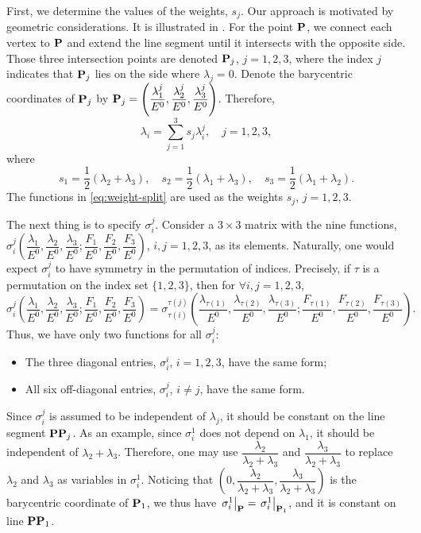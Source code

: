 First, we determine the values of the weights, $s_j$. Our approach is 
motivated by geometric considerations. It is illustrated in
. For the point $\mathbf{P}$, we connect each 
vertex to $\mathbf{P}$ and extend the line segment until it intersects with the
opposite side. Those three intersection points are denoted $\mathbf{P}_j$,
$j = 1,2,3$, where the index $j$ indicates that $\mathbf{P}_j$ lies on the side where
$\lambda_j = 0$. Denote the barycentric coordinates of $\mathbf{P}_j$ by 
$\mathbf{P}_j = \left( \dfrac{\lambda^j_1}{E^0}, \dfrac{\lambda^j_2}{E^0},
\dfrac{\lambda^j_3}{E^0} \right)$.
Therefore,
\[
  \lambda_i = \sum\limits_{j=1}^3 s_j \lambda^j_i,\quad
  j = 1,2,3,
\]
where
\begin{equation}\label{eq:weight-split} 
  s_1 = \frac12(\lambda_2+\lambda_3),\quad
  s_2 = \frac12(\lambda_1+\lambda_3),\quad
  s_3 = \frac12(\lambda_1+\lambda_2).
\end{equation}
The functions in \eqref{eq:weight-split} are used as the weights $s_j$, 
$j=1,2,3$.

The next thing is to specify $\sigma^j_i$.
Consider a $3 \times 3$ matrix with the nine functions,
$\sigma^j_i \left(\dfrac{\lambda_1}{E^0},
  \dfrac{\lambda_2}{E^0},\dfrac{\lambda_3}{E^0};
  \dfrac{F_1}{E^0},\dfrac{F_2}{E^0}, \dfrac{F_3}{E^0}\right)$,
$i, j = 1,2,3$, as its elements. Naturally, one would expect $\sigma^j_i$
to have symmetry in the permutation of indices. Precisely, if $\tau$ is a permutation on
the index set $\{1,2,3\}$, then for $\forall i, j = 1,2,3$,
\[
\sigma^j_i \left(\dfrac{\lambda_1}{E^0},
  \dfrac{\lambda_2}{E^0},\dfrac{\lambda_3}{E^0};
  \dfrac{F_1}{E^0},\dfrac{F_2}{E^0}, \dfrac{F_3}{E^0}\right) =
\sigma^{\tau(j)}_{\tau(i)} \left(\dfrac{\lambda_{\tau(1)}}{E^0},
  \dfrac{\lambda_{\tau(2)}}{E^0},\dfrac{\lambda_{\tau(3)}}{E^0};
  \dfrac{F_{\tau(1)}}{E^0},\dfrac{F_{\tau(2)}}{E^0},
  \dfrac{F_{\tau(3)}}{E^0}\right).
\]
Thus, we have only two functions for all $\sigma^j_i$:
\begin{itemize}
\item The three diagonal entries, $\sigma^i_i$, $i = 1,2,3$, have the
  same form;
\item All six off-diagonal entries, $\sigma^j_i$, $i \neq j$, have
  the same form.
\end{itemize}
Since $\sigma_i^j$ is assumed to be independent of $\lambda_j$, it
should be constant on the line segment ${\mathbf{P} \mathbf{P}_j}$. As an example, 
since $\sigma_i^1$ does not depend on $\lambda_1$, it should
be independent of $\lambda_2 + \lambda_3$. Therefore, one may use 
$\dfrac{\lambda_2} {\lambda_2 + \lambda_3}$ and
$\dfrac{\lambda_3}{\lambda_2 + \lambda_3}$ to replace $\lambda_2$ and $\lambda_3$
as variables in $\sigma_i^1$. Noticing that
$\left(0, \dfrac{\lambda_2} {\lambda_2 + \lambda_3},
\dfrac{\lambda_3}{\lambda_2 + \lambda_3}\right)$
is the barycentric
coordinate of $\mathbf{P}_1$, we thus have
$\left. \sigma_i^1 \right|_{\mathbf{P}} = \left. \sigma_i^1 \right|_{\mathbf{P}_1}$,
and it is constant on line ${\mathbf{P} \mathbf{P}_1}$.

